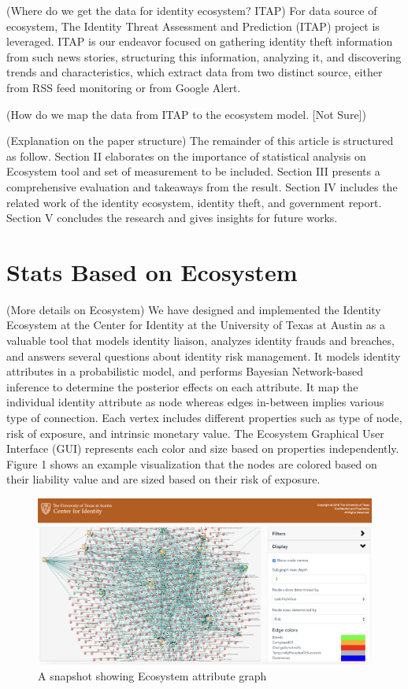 \documentclass[letterpaper, 10 pt, conference]{ieeeconf}  %
\begin{document}
(Where do we get the data for identity ecosystem? ITAP)
For data source of ecosystem, The Identity Threat Assessment and Prediction (ITAP) project is leveraged. ITAP is our endeavor focused on gathering identity theft information from such news stories, structuring this information, analyzing it, and discovering trends and characteristics, which extract data from two distinct source, either from RSS feed monitoring or from Google Alert.

(How do we map the data from ITAP to the ecosystem model. [Not Sure])

(Explanation on the paper structure)
The remainder of this article is structured as follow. Section II elaborates on the importance of statistical analysis on Ecosystem tool and set of measurement to be included. Section III presents a comprehensive evaluation and takeaways from the result. Section IV includes the related work of the identity ecosystem, identity theft, and government report. Section V concludes the research and gives insights for future works.


\section{Stats Based on Ecosystem}
(More details on Ecosystem) We have designed and implemented the Identity Ecosystem at the Center for Identity at the University of Texas at Austin as a valuable tool that models identity liaison, analyzes identity frauds and breaches, and answers several questions about identity risk management. It models identity attributes in a probabilistic model, and performs Bayesian Network-based inference to determine the posterior effects on each attribute. It map the individual identity attribute as node whereas edges in-between implies various type of connection.
Each vertex includes different properties such as type of node, risk of exposure, and intrinsic monetary value. The Ecosystem Graphical User Interface (GUI) represents each color and size based on properties independently. Figure 1 shows an example visualization that the nodes are colored based on their liability value and are sized based on their risk of exposure.

\begin{figure}[h!]
  \includegraphics[width=\linewidth]{pic1.png}
  \caption{A snapshot showing Ecosystem attribute graph}
  \label{fig:pic1}
\end{figure}
\end{document}
